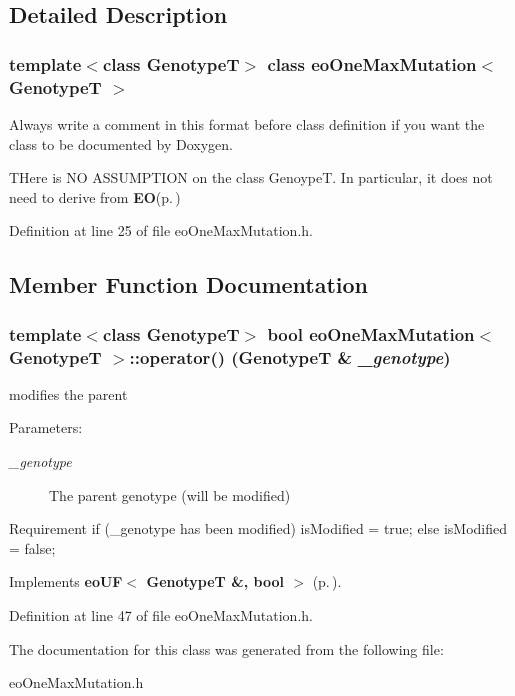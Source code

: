 \subsection{Detailed Description}
\subsubsection*{template$<$class Genotype\-T$>$ class eo\-One\-Max\-Mutation$<$ Genotype\-T $>$}

Always write a comment in this format before class definition if you want the class to be documented by Doxygen. 

THere is NO ASSUMPTION on the class Genoype\-T. In particular, it does not need to derive from {\bf EO}{\rm (p.\,\pageref{class_e_o})} 



Definition at line 25 of file eo\-One\-Max\-Mutation.h.

\subsection{Member Function Documentation}
\subsubsection{\setlength{\rightskip}{0pt plus 5cm}template$<$class Genotype\-T$>$ bool {\bf eo\-One\-Max\-Mutation}$<$ Genotype\-T $>$::operator() (Genotype\-T \& {\em \_\-genotype})\hspace{0.3cm}{\tt  [inline, virtual]}}\label{classeo_one_max_mutation_a2}


modifies the parent 

\begin{Desc}
\item[Parameters:]
\begin{description}
\item[{\em \_\-genotype}]The parent genotype (will be modified)\end{description}
\end{Desc}


Requirement if (\_\-genotype has been modified) is\-Modified = true; else is\-Modified = false; 

Implements {\bf eo\-UF$<$ Genotype\-T \&, bool $>$} {\rm (p.\,\pageref{classeo_u_f_a1})}.

Definition at line 47 of file eo\-One\-Max\-Mutation.h.

The documentation for this class was generated from the following file:\begin{CompactItemize}
\item 
eo\-One\-Max\-Mutation.h\end{CompactItemize}
